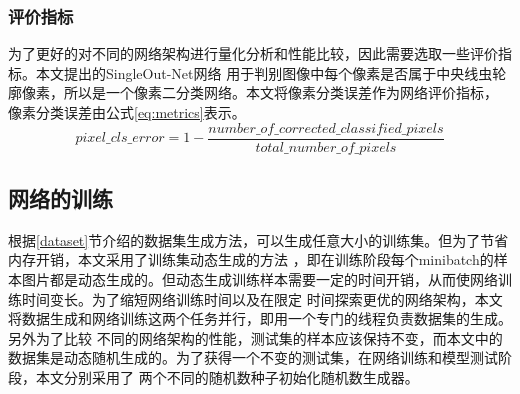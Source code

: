 \subsubsection{评价指标}
	为了更好的对不同的网络架构进行量化分析和性能比较，因此需要选取一些评价指标。本文提出的SingleOut-Net网络
	用于判别图像中每个像素是否属于中央线虫轮廓像素，所以是一个像素二分类网络。本文将像素分类误差作为网络评价指标，
	像素分类误差由公式\ref{eq:metrics}表示。
	\begin{equation}
		pixel\_cls\_error =1- \frac{number\_of\_corrected\_classified\_pixels}{total\_number\_of\_pixels} \label{eq:metrics}
	\end{equation}
\subsection{网络的训练}
	
	根据\ref{dataset}节介绍的数据集生成方法，可以生成任意大小的训练集。但为了节省内存开销，本文采用了训练集动态生成的方法
	，即在训练阶段每个minibatch的样本图片都是动态生成的。但动态生成训练样本需要一定的时间开销，从而使网络训练时间变长。为了缩短网络训练时间以及在限定
	时间探索更优的网络架构，本文将数据生成和网络训练这两个任务并行，即用一个专门的线程负责数据集的生成。另外为了比较
	不同的网络架构的性能，测试集的样本应该保持不变，而本文中的数据集是动态随机生成的。为了获得一个不变的测试集，在网络训练和模型测试阶段，本文分别采用了
	两个不同的随机数种子初始化随机数生成器。
	
